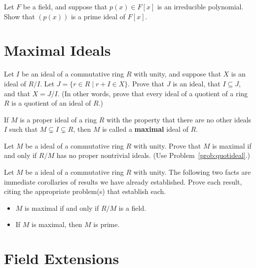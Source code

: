 \begin{problem}
Let \(F\) be a field, and suppose that \(p(x) \in F[x]\) is an irreducible polynomial. Show that \((p(x))\) is a prime ideal of \(F[x]\).
\end{problem}

\section{Maximal Ideals}

\begin{problem}\label{prob:quotideal}
Let \(I\) be an ideal of a commutative ring \(R\) with unity, and suppose that \(X\) is an ideal of \(R/I\). Let \(J = \{r \in R \mid r+I \in X\}\). Prove that \(J\) is an ideal, that \(I \subseteq J\), and that \(X = J/I\). (In other words, prove that every ideal of a quotient of a ring \(R\) is a quotient of an ideal of \(R\).)
\end{problem}

\begin{definition}
If \(M\) is a proper ideal of a ring \(R\) with the property that there are no other ideals \(I\) such that \(M \subsetneq I \subsetneq R\), then \(M\) is called a \textbf{maximal} ideal of \(R\).
\end{definition}

\begin{problem}
Let \(M\) be a ideal of a commutative ring \(R\) with unity. Prove that \(M\) is maximal if and only if \(R/M\) has no proper nontrivial ideals. (Use Problem~\ref{prob:quotideal}.)
\end{problem}

\begin{problem}
Let \(M\) be a ideal of a commutative ring \(R\) with unity. The following two facts are immediate corollaries of results we have already established. Prove each result, citing the appropriate problem(s) that establish each.
\begin{itemize}
  \item \(M\) is maximal if and only if \(R/M\) is a field.
  \item If \(M\) is maximal, then \(M\) is prime.
\end{itemize}
\end{problem}

\section{Field Extensions}

